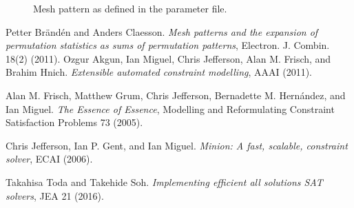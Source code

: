 \documentclass[11pt]{article}
\theoremstyle{plain}
\theoremstyle{definition}
\theoremstyle{remark}
\begin{document}
\begin{figure}
\begin{center}
\caption{Mesh pattern as defined in the parameter file.\label{fig:pattern}}
\end{center}
\end{figure}



\begin{thebibliography}{99}
 Petter Br{\"a}nd{\'e}n and Anders Claesson. \emph{Mesh patterns and the expansion of permutation statistics as sums of permutation patterns}, Electron. J. Combin. 18(2) (2011).
 Ozgur Akgun, Ian Miguel, Chris Jefferson, Alan M. Frisch, and Brahim Hnich. \emph{Extensible automated constraint modelling}, AAAI (2011).

 Alan M. Frisch, Matthew Grum, Chris Jefferson, Bernadette M. Hernández, and Ian Miguel. \emph{The Essence of Essence}, Modelling and Reformulating Constraint Satisfaction Problems 73 (2005).

 Chris Jefferson, Ian P. Gent, and Ian Miguel. \emph{Minion: A fast, scalable, constraint solver}, ECAI (2006).

 Takahisa Toda and Takehide Soh. \emph{Implementing efficient all solutions SAT solvers}, JEA 21 (2016). 

\end{thebibliography}
\end{document}
